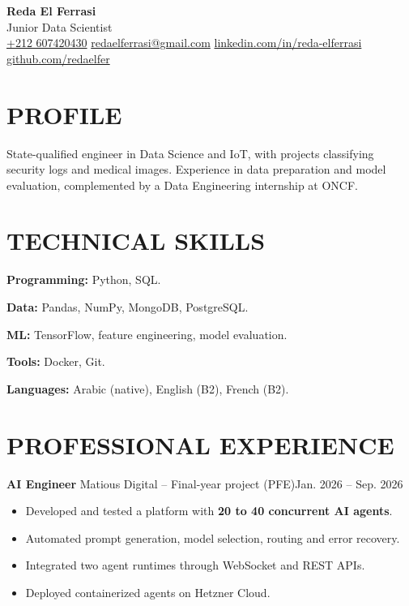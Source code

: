 \documentclass[11pt,a4paper]{article}
\newcommand{\entry}[2]{\noindent #1\hfill #2\par}
\begin{document}
\begin{center}
  {\LARGE\bfseries Reda El Ferrasi}\\[3pt]
  {\large Junior Data Scientist}\\[5pt]
  {\small
    \href{tel:+212607420430}{+212 607420430}
    \enspace\textbar{}\enspace
    \href{mailto:redaelferrasi@gmail.com}{redaelferrasi@gmail.com}
    \enspace\textbar{}\enspace
    \href{https://www.linkedin.com/in/reda-elferrasi/}{linkedin.com/in/reda-elferrasi}
    \enspace\textbar{}\enspace
    \href{https://github.com/redaelfer}{github.com/redaelfer}
  }
\end{center}
\vspace{-5pt}


\section*{PROFILE}
State-qualified engineer in Data Science and IoT, with projects classifying security logs and medical images. Experience in data preparation and model evaluation, complemented by a Data Engineering internship at ONCF.

\section*{TECHNICAL SKILLS}
\textbf{Programming:} Python, SQL.\par
\textbf{Data:} Pandas, NumPy, MongoDB, PostgreSQL.\par
\textbf{ML:} TensorFlow, feature engineering, model evaluation.\par
\textbf{Tools:} Docker, Git.\par
\textbf{Languages:} Arabic (native), English (B2), French (B2).

\section*{PROFESSIONAL EXPERIENCE}

\entry{\textbf{AI Engineer} \textbar{} Matious Digital -- Final-year project (PFE)}{Jan. 2026 -- Sep. 2026}
\begin{itemize}
  \item Developed and tested a platform with \textbf{20 to 40 concurrent AI agents}.
  \item Automated prompt generation, model selection, routing and error recovery.
  \item Integrated two agent runtimes through WebSocket and REST APIs.
  \item Deployed containerized agents on Hetzner Cloud.
\end{itemize}
\end{document}
